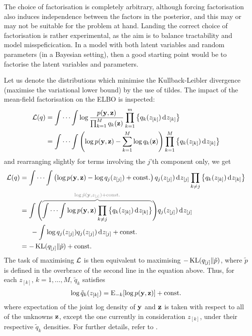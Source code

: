 \begin{remark}
The choice of factorisation is completely arbitrary, although forcing factorisation also induces independence between the factors in the posterior, and this may or may not be suitable for the problem at hand.
Landing the correct choice of factorisation is rather experimental, as the aim is to balance tractability and model misspeficication.
In a model with both latent variables and random parameters (in a Bayesian setting), then a good starting point would be to factorise the latent variables and parameters.
\end{remark}

Let us denote the distributions which minimise the Kullback-Leibler divergence (maximise the variational lower bound) by the use of tildes.
The impact of the mean-field factorisation on the ELBO is inspected:
\begin{align*}
  {\mathcal L}(q) 
  &= \idotsint \log \frac{p({\mathbf y},{\mathbf z})}{\prod_{k=1}^M q_k({\mathbf z})}  \prod_{k=1}^m \left\{ q_k(z_{[k]}) \operatorname{d}\hspace{0.5pt}\! z_{[k]} \right\} \\
  &= \idotsint \left( \log p({\mathbf y},{\mathbf z}) - \sum_{k=1}^M \log q_k({\mathbf z})  \right) \prod_{k=1}^M \left\{ q_k(z_{[k]}) \operatorname{d}\hspace{0.5pt}\! z_{[k]} \right\} 
\end{align*}
and rearranging slightly for terms involving the $j$'th component only, we get
\begin{align*}
  \cL(q) 
  &= \idotsint \left( \log p(\by,\bz)  - \log q_j(z_{[j]}) + \const \right) q_j(z_{[j]}) \dint z_{[j]} \prod_{k\neq j} \left\{ q_k(z_{[k]}) \dint z_{[k]} \right\} \\
  &= \int \Bigg( 
  \greyoverbrace{\idotsint \log p(\by,\bz)  \prod_{k\neq j} \left\{ q_k(z_{[k]}) \dint z_{[k]} \right\}}{\log \tilde p(\by,z_{[j]}) + \const}
  \Bigg) q_j(z_{[j]}) \dint z_{[j]} \\
  &\phantom{==} - \int  \log q_j(z_{[j]}) q_j(z_{[j]}) \dint z_{[j]} + \const \\
  &= -\KL(q_{[j]} \Vert \tilde p) + \const
\end{align*}
The task of maximising ${\mathcal L}$ is then equivalent to maximising $-\operatorname{KL}(q_{[j]} \Vert \tilde p)$, where $\tilde p$ is defined in the overbrace of the second line in the equation above.
Thus, for each $z_{[k]}$, $k=1,\dots,M$, $\tilde q_k$ satisfies
\begin{align}\label{eq:qtilde}
  \log \tilde q_k(z_{[k]}) = \operatorname{E}_{-k} [ \log p({\mathbf y},{\mathbf z}) ] + \text{const.}\hspace{0.01em}
\end{align}
where expectation of the joint log density of ${\mathbf y}$ and ${\mathbf z}$ is taken with respect to all of the unknowns ${\mathbf z}$, except the one currently in consideration $z_{[k]}$, under their respective $\tilde q_k$ densities. 
For further details, refer to \citet[equation 10.9, p. 466]{bishop2006pattern}.

